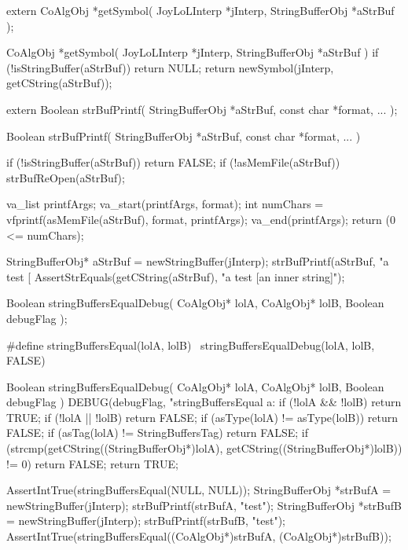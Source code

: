 \startCHeader
extern CoAlgObj *getSymbol(
  JoyLoLInterp    *jInterp,
  StringBufferObj *aStrBuf
);
\stopCHeader

\startCCode
CoAlgObj *getSymbol(
  JoyLoLInterp    *jInterp,
  StringBufferObj *aStrBuf
) {
  if (!isStringBuffer(aStrBuf)) return NULL;
  return newSymbol(jInterp, getCString(aStrBuf));
}
\stopCCode

\stopTestSuite

\startTestSuite[strBufPrintf]

\startCHeader
extern Boolean strBufPrintf(
  StringBufferObj   *aStrBuf,
  const char        *format, 
  ...
);
\stopCHeader

\startCCode
Boolean strBufPrintf(
  StringBufferObj   *aStrBuf,
  const char        *format,
  ...
) {
  if (!isStringBuffer(aStrBuf)) return FALSE;
  if (!asMemFile(aStrBuf)) strBufReOpen(aStrBuf);
  
  va_list printfArgs;
  va_start(printfArgs, format);
  int numChars = vfprintf(asMemFile(aStrBuf), format, printfArgs);
  va_end(printfArgs);
  return (0 <= numChars);
}
\stopCCode

\startCTest
  StringBufferObj* aStrBuf = newStringBuffer(jInterp);
  strBufPrintf(aStrBuf, "a test [%
  AssertStrEquals(getCString(aStrBuf), "a test [an inner string]");
\stopCTest
\stopTestCase
\stopTestSuite


\startCHeader
Boolean stringBuffersEqualDebug(
  CoAlgObj* lolA,
  CoAlgObj* lolB,
  Boolean debugFlag
);

#define stringBuffersEqual(lolA, lolB) \
  stringBuffersEqualDebug(lolA, lolB, FALSE)
\stopCHeader

\startCCode
Boolean stringBuffersEqualDebug(
  CoAlgObj* lolA,
  CoAlgObj* lolB,
  Boolean debugFlag
) {
  DEBUG(debugFlag, "stringBuffersEqual a:%
  if (!lolA && !lolB) return TRUE;
  if (!lolA || !lolB) return FALSE;
  if (asType(lolA) != asType(lolB)) return FALSE;
  if (asTag(lolA)  != StringBuffersTag) return FALSE;
  if (strcmp(getCString((StringBufferObj*)lolA),
    getCString((StringBufferObj*)lolB)) != 0) return FALSE;
  return TRUE;
}
\stopCCode


\startCTest
  AssertIntTrue(stringBuffersEqual(NULL, NULL));
  StringBufferObj *strBufA = newStringBuffer(jInterp);
  strBufPrintf(strBufA, "test");
  StringBufferObj *strBufB = newStringBuffer(jInterp);
  strBufPrintf(strBufB, "test");
  AssertIntTrue(stringBuffersEqual((CoAlgObj*)strBufA, (CoAlgObj*)strBufB));
\stopCTest
\stopTestCase

